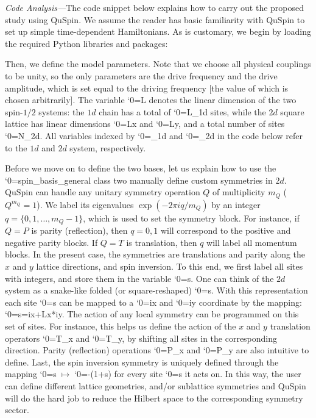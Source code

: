 \documentclass{SciPost}
\newcommand\0{\scalebox{-1}[1]{0}}
\let\svttfamily\ttfamily
\renewcommand\ttfamily{\svttfamily\catcode`0=\active }
\renewcommand\texttt{\bgroup\ttfamily\texttthelp}
\def\texttthelp#1{#1\egroup}
\newcommand{\Spincode}{example9.py}
\begin{document}
\noindent\emph{Code Analysis---}The code snippet below explains how to carry out the proposed study using QuSpin. We assume the reader has basic familiarity with QuSpin to set up simple time-dependent Hamiltonians. As is customary, we begin by loading the required Python libraries and packages:

Then, we define the model parameters. Note that we choose all physical couplings to be unity, so the only parameters are the drive frequency and the drive amplitude, which is set equal to the driving frequency [the value of which is chosen arbitrarily]. The variable \texttt{L} denotes the linear dimension of the two spin-$1/2$ systems: the $1d$ chain has a total of \texttt{L\_1d} sites, while the $2d$ square lattice has linear dimensions \texttt{Lx} and \texttt{Ly}, and a total number of sites \texttt{N\_2d}. All variables indexed by \texttt{\_1d} and \texttt{\_2d} in the code below refer to the $1d$ and $2d$ system, respectively. 

Before we move on to define the two bases, let us explain how to use the \texttt{spin\_basis\_general} class two manually define custom symmetries in $2d$. QuSpin can handle any unitary symmetry operation $Q$ of multiplicity $m_Q$ ($Q^{m_Q}=1$). We label its eigenvalues $\exp(-2\pi i q/m_Q)$ by an integer $q=\{0,1,\dots,m_Q-1\}$, which is used to set the symmetry block. For instance, if $Q=P$ is parity (reflection), then $q=0,1$ will correspond to the positive and negative parity blocks. If $Q=T$ is translation, then $q$ will label all momentum blocks. In the present case, the symmetries are translations and parity along the $x$ and $y$ lattice directions, and spin inversion. To this end, we first label all sites with integers, and store them in the variable \texttt{s}. One can think of the $2d$ system as a snake-like folded (or square-reshaped) \texttt{s}. With this representation each site \texttt{s} can be mapped to a \texttt{ix} and \texttt{iy} coordinate by the mapping: \texttt{s=ix+Lx*iy}. The action of any local symmetry can be programmed on this set of sites. For instance, this helps us define the action of the $x$ and $y$ translation operators \texttt{T\_x} and \texttt{T\_y}, by shifting all sites in the corresponding direction. Parity (reflection) operations \texttt{P\_x} and \texttt{P\_y} are also intuitive to define. Last, the spin inversion symmetry is uniquely defined through the mapping \texttt{s}$\;\mapsto\;$\texttt{-(1+s)} for every site \texttt{s} it acts on. In this way, the user can define different lattice geometries, and/or sublattice symmetries and QuSpin will do the hard job to reduce the Hilbert space to the corresponding symmetry sector.
\end{document}
